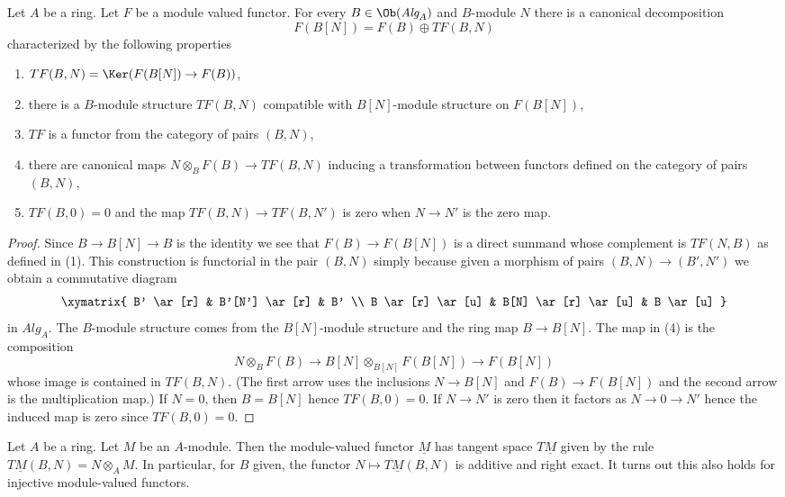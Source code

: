 \begin{lemma}
\label{lemma-tangent-functor}
Let $A$ be a ring. Let $F$ be a module valued functor.
For every $B \in \Ob(\textit{Alg}_A)$ and $B$-module $N$
there is a canonical decomposition
$$
F(B[N]) = F(B) \oplus TF(B, N)
$$
characterized by the following properties
\begin{enumerate}
\item $TF(B, N) = \Ker(F(B[N]) \to F(B))$,
\item there is a $B$-module structure $TF(B, N)$
compatible with $B[N]$-module structure on $F(B[N])$,
\item $TF$ is a functor from the category of pairs $(B, N)$,
\item
\label{item-mult-map}
there are canonical maps $N \otimes_B F(B) \to TF(B, N)$
inducing a transformation between functors defined on the category
of pairs $(B, N)$,
\item $TF(B, 0) = 0$ and the map $TF(B, N) \to TF(B, N')$ is
zero when $N \to N'$ is the zero map.
\end{enumerate}
\end{lemma}

\begin{proof}
Since $B \to B[N] \to B$ is the identity we see that $F(B) \to F(B[N])$
is a direct summand whose complement is $TF(N, B)$ as defined in (1).
This construction is functorial in the pair $(B, N)$ simply because
given a morphism of pairs $(B, N) \to (B', N')$ we obtain a commutative
diagram
$$
\xymatrix{
B' \ar[r] & B'[N'] \ar[r] & B' \\
B \ar[r] \ar[u] & B[N] \ar[r] \ar[u] & B \ar[u]
}
$$
in $\textit{Alg}_A$. The $B$-module structure comes from the $B[N]$-module
structure and the ring map $B \to B[N]$. The map in (4) is the
composition
$$
N \otimes_B F(B) \longrightarrow
B[N] \otimes_{B[N]} F(B[N]) \longrightarrow F(B[N])
$$
whose image is contained in $TF(B, N)$. (The first arrow uses the inclusions
$N \to B[N]$ and $F(B) \to F(B[N])$ and the second arrow is the multiplication
map.) If $N = 0$, then $B = B[N]$
hence $TF(B, 0) = 0$. If $N \to N'$ is zero then it factors as
$N \to 0 \to N'$ hence the induced map is zero since $TF(B, 0) = 0$.
\end{proof}

\noindent
Let $A$ be a ring. Let $M$ be an $A$-module. Then the module-valued functor
$\underline{M}$ has tangent space $T\underline{M}$ given by the rule
$T\underline{M}(B, N) = N \otimes_A M$. In particular, for $B$ given, the
functor $N \mapsto T\underline{M}(B, N)$ is additive and right exact. It turns
out this also holds for injective module-valued functors.

